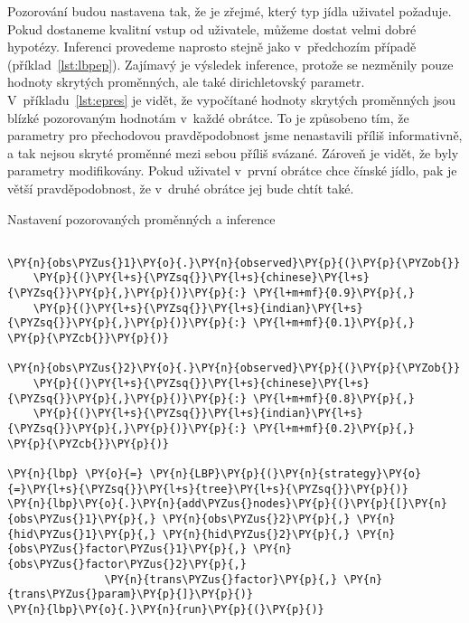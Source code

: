 Pozorování budou nastavena tak, že je zřejmé, který typ jídla uživatel požaduje.
Pokud dostaneme kvalitní vstup od uživatele, můžeme dostat velmi dobré hypotézy.
Inferenci provedeme naprosto stejně jako v~předchozím případě (příklad~\ref{lst:lbpep}).
Zajímavý je výsledek inference, protože se nezměnily pouze hodnoty skrytých proměnných, ale také dirichletovský parametr.
V~příkladu~\ref{lst:epres} je vidět, že vypočítané hodnoty skrytých proměnných jsou blízké pozorovaným hodnotám v~každé obrátce.
To je způsobeno tím, že parametry pro přechodovou pravděpodobnost jsme nenastavili příliš informativně, a tak nejsou skryté proměnné mezi sebou příliš svázané.
Zároveň je vidět, že byly parametry modifikovány.
Pokud uživatel v~první obrátce chce čínské jídlo, pak je větší pravděpodobnost, že v~druhé obrátce jej bude chtít také.

\begin{example}
\caption{Nastavení pozorovaných proměnných a inference}
\label{lst:lbpep}
\begin{Verbatim}[commandchars=\\\{\}]

\PY{n}{obs\PYZus{}1}\PY{o}{.}\PY{n}{observed}\PY{p}{(}\PY{p}{\PYZob{}}
    \PY{p}{(}\PY{l+s}{\PYZsq{}}\PY{l+s}{chinese}\PY{l+s}{\PYZsq{}}\PY{p}{,}\PY{p}{)}\PY{p}{:} \PY{l+m+mf}{0.9}\PY{p}{,}
    \PY{p}{(}\PY{l+s}{\PYZsq{}}\PY{l+s}{indian}\PY{l+s}{\PYZsq{}}\PY{p}{,}\PY{p}{)}\PY{p}{:} \PY{l+m+mf}{0.1}\PY{p}{,}
\PY{p}{\PYZcb{}}\PY{p}{)}

\PY{n}{obs\PYZus{}2}\PY{o}{.}\PY{n}{observed}\PY{p}{(}\PY{p}{\PYZob{}}
    \PY{p}{(}\PY{l+s}{\PYZsq{}}\PY{l+s}{chinese}\PY{l+s}{\PYZsq{}}\PY{p}{,}\PY{p}{)}\PY{p}{:} \PY{l+m+mf}{0.8}\PY{p}{,}
    \PY{p}{(}\PY{l+s}{\PYZsq{}}\PY{l+s}{indian}\PY{l+s}{\PYZsq{}}\PY{p}{,}\PY{p}{)}\PY{p}{:} \PY{l+m+mf}{0.2}\PY{p}{,}
\PY{p}{\PYZcb{}}\PY{p}{)}

\PY{n}{lbp} \PY{o}{=} \PY{n}{LBP}\PY{p}{(}\PY{n}{strategy}\PY{o}{=}\PY{l+s}{\PYZsq{}}\PY{l+s}{tree}\PY{l+s}{\PYZsq{}}\PY{p}{)}
\PY{n}{lbp}\PY{o}{.}\PY{n}{add\PYZus{}nodes}\PY{p}{(}\PY{p}{[}\PY{n}{obs\PYZus{}1}\PY{p}{,} \PY{n}{obs\PYZus{}2}\PY{p}{,} \PY{n}{hid\PYZus{}1}\PY{p}{,} \PY{n}{hid\PYZus{}2}\PY{p}{,} \PY{n}{obs\PYZus{}factor\PYZus{}1}\PY{p}{,} \PY{n}{obs\PYZus{}factor\PYZus{}2}\PY{p}{,}
               \PY{n}{trans\PYZus{}factor}\PY{p}{,} \PY{n}{trans\PYZus{}param}\PY{p}{]}\PY{p}{)}
\PY{n}{lbp}\PY{o}{.}\PY{n}{run}\PY{p}{(}\PY{p}{)}
\end{Verbatim}
\end{example}


